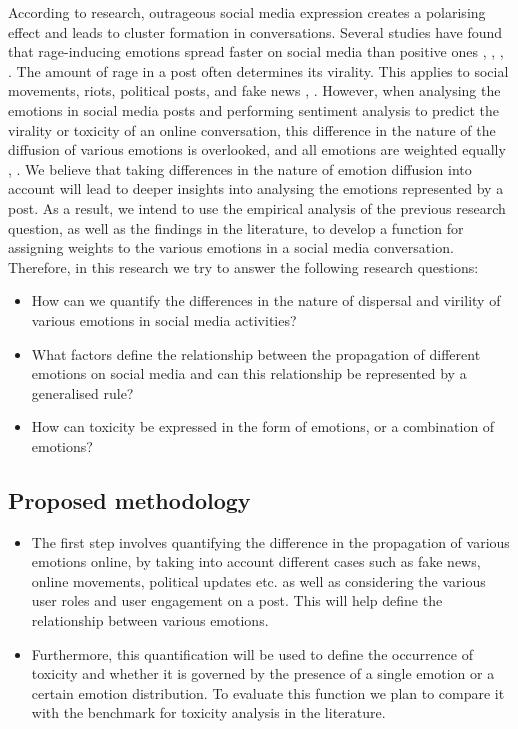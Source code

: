 According to research, outrageous social media expression creates a polarising effect and leads to cluster formation in conversations. Several studies have found that rage-inducing emotions spread faster on social media than positive ones \cite{bacaksizlar2019understanding}, \cite{steinert2022emotions}, \cite{chuai2020anger}, \cite{yi2022depicting}. The amount of rage in a post often determines its virality. This applies to social movements, riots, political posts, and fake news \cite{solovev2022moral}, \cite{mirbabaie2021development}. However, when analysing the emotions in social media posts and performing sentiment analysis to predict the virality or toxicity of an online conversation, this difference in the nature of the diffusion of various emotions is overlooked, and all emotions are weighted equally \cite{yue2019survey}, \cite{nemes2021social}. We believe that taking differences in the nature of emotion diffusion into account will lead to deeper insights into analysing the emotions represented by a post. As a result, we intend to use the empirical analysis of the previous research question, as well as the findings in the literature, to develop a function for assigning weights to the various emotions in a social media conversation. Therefore, in this research we try to answer the following research questions:
\begin{itemize}
    \item How can we quantify the differences in the nature of dispersal and virility of various emotions in social media activities?
    \item What factors define the relationship between the propagation of different emotions on social media and can this relationship be represented by a generalised rule?
    \item How can toxicity be expressed in the form of emotions, or a combination of emotions?
\end{itemize}

\subsection{Proposed methodology}
\begin{itemize}
    \item The first step involves quantifying the difference in the propagation of various emotions online, by taking into account different cases such as fake news, online movements, political updates etc. as well as considering the various user roles and user engagement on a post. This will help define the relationship between various emotions.
    \item Furthermore, this quantification will be used to define the occurrence of toxicity and whether it is governed by the presence of a single emotion or a certain emotion distribution. To evaluate this function we plan to compare it with the benchmark for toxicity analysis in the literature.
\end{itemize}
